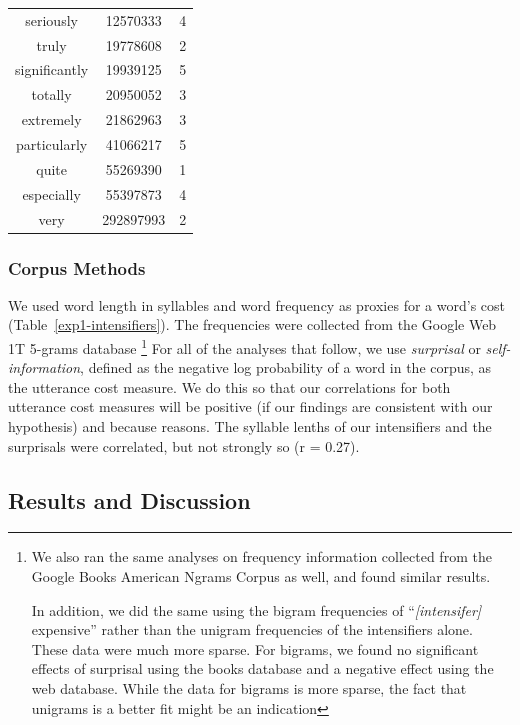 \documentclass[10pt,letterpaper]{article}
\newcommand{\w}[1]{\emph{#1}}
\newcommand{\todo}[1]{{\color{red}#1}}
\begin{document}
\begin{table}[ht]
\begin{center}
\begin{tabular}{ccc}
    seriously & 12570333 & 4 \\
    truly & 19778608 & 2 \\
    significantly & 19939125 & 5 \\
    totally & 20950052 & 3 \\
    extremely & 21862963 & 3 \\
    particularly & 41066217 & 5 \\
    quite & 55269390 & 1 \\
    especially & 55397873 & 4 \\
    very & 292897993 & 2
  \end{tabular}
 \end{center}
\end{table}

\subsubsection{Corpus Methods}

We used word length in syllables and word frequency as proxies for a word's cost (Table~\ref{exp1-intensifiers}).
The frequencies were collected from the Google Web 1T 5-grams database \cite{web1t5gram}\footnote{
We also ran the same analyses on frequency information collected from the Google Books American Ngrams Corpus \cite{books2011} as well, and found similar results.

In addition, we did the same using the bigram frequencies of ``\emph{[intensifer]} expensive'' rather than the unigram frequencies of the intensifiers alone. These data were much more sparse. For bigrams, we found no significant effects of surprisal using the books database and a negative effect using the web database. While the data for bigrams is more sparse, the fact that unigrams is a better fit might be an indication 
}
For all of the analyses that follow, we use \w{surprisal} or \w{self-information}, defined as the negative log probability of a word in the corpus, as the utterance cost measure. We do this so that our correlations for both utterance cost measures will be positive (if our findings are consistent with our hypothesis) and because \todo{reasons}. The syllable lenths of our intensifiers and the surprisals %
were correlated, but not strongly so (r = 0.27).

\subsection{Results and Discussion}
\end{document}
